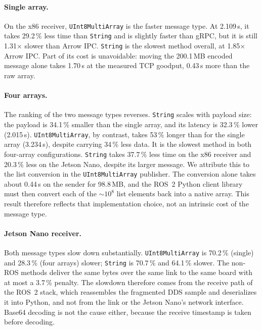 \paragraph{Single array.} On the x86 receiver, \texttt{UInt8MultiArray} is the faster
message type. At 2.109\,s, it takes 29.2\,\% less time than \texttt{String} and is
slightly faster than gRPC, but it is still 1.31$\times$ slower than Arrow IPC.
\texttt{String} is the slowest method overall, at 1.85$\times$ Arrow IPC. Part of its
cost is unavoidable: moving the 200.1\,MB encoded message alone takes 1.70\,s at the
measured TCP goodput, 0.43\,s more than the raw array.

\paragraph{Four arrays.} The ranking of the two message types reverses.
\texttt{String} scales with payload size: the payload is 34.1\,\% smaller than the
single array, and its latency is 32.3\,\% lower (2.015\,s). \texttt{UInt8MultiArray},
by contrast, takes 53\,\% longer than for the single array (3.234\,s), despite
carrying 34\,\% less data. It is the slowest method in both four-array configurations.
\texttt{String} takes 37.7\,\% less time on the x86 receiver and 20.3\,\% less on the
Jetson Nano, despite its larger message. We attribute this to the list conversion in
the \texttt{UInt8MultiArray} publisher. The conversion alone takes about 0.44\,s on the
sender for 98.8\,MB, and the ROS~2 Python client library must then convert each of the
$\sim$$10^8$ list elements back into a native array. This result therefore reflects
that implementation choice, not an intrinsic cost of the message type.

\paragraph{Jetson Nano receiver.} Both message types slow down substantially.
\texttt{UInt8MultiArray} is 70.2\,\% (single) and 28.3\,\% (four arrays) slower;
\texttt{String} is 70.7\,\% and 64.1\,\% slower. The non-ROS methods deliver the same
bytes over the same link to the same board with at most a 3.7\,\% penalty. The
slowdown therefore comes from the receive path of the ROS~2 stack, which reassembles
the fragmented DDS sample and deserializes it into Python, and not from the link or
the Jetson Nano's network interface. Base64 decoding is not the cause either, because
the receive timestamp is taken before decoding.

